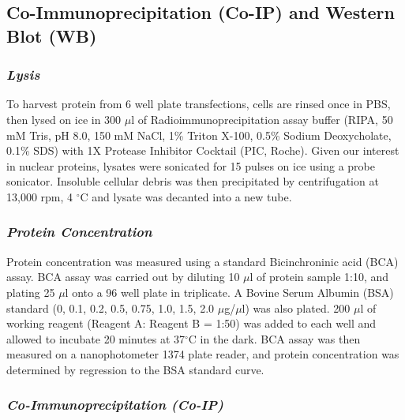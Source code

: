 \documentclass[onehalf,12pt]{beavtex}
\begin{document}
  \subsection{Co-Immunoprecipitation (Co-IP) and Western Blot
  (WB)}\label{co-immunoprecipitation-co-ip-and-western-blot-wb}
  
  \subsubsection*{\texorpdfstring{\emph{Lysis}}{Lysis}}\label{lysis}
  
  To harvest protein from 6 well plate transfections, cells are rinsed
  once in PBS, then lysed on ice in 300 \(\mu\)l of
  Radioimmunoprecipitation assay buffer (RIPA, 50 mM Tris, pH 8.0, 150 mM
  NaCl, 1\% Triton X-100, 0.5\% Sodium Deoxycholate, 0.1\% SDS) with 1X
  Protease Inhibitor Cocktail (PIC, Roche). Given our interest in nuclear
  proteins, lysates were sonicated for 15 pulses on ice using a probe
  sonicator. Insoluble cellular debris was then precipitated by
  centrifugation at 13,000 rpm, 4 \(^\circ\)C and lysate was decanted into
  a new tube.
  
  \subsubsection*{\texorpdfstring{\emph{Protein
  Concentration}}{Protein Concentration}}\label{protein-concentration}
  
  Protein concentration was measured using a standard Bicinchroninic acid
  (BCA) assay. BCA assay was carried out by diluting 10 \(\mu\)l of
  protein sample 1:10, and plating 25 \(\mu\)l onto a 96 well plate in
  triplicate. A Bovine Serum Albumin (BSA) standard (0, 0.1, 0.2, 0.5,
  0.75, 1.0, 1.5, 2.0 \(\mu\)g/\(\mu\)l) was also plated. 200 \(\mu\)l of
  working reagent (Reagent A: Reagent B = 1:50) was added to each well and
  allowed to incubate 20 minutes at 37\(^\circ\)C in the dark. BCA assay
  was then measured on a nanophotometer 1374 plate reader, and protein
  concentration was determined by regression to the BSA standard curve.
  
  \subsubsection*{\texorpdfstring{\emph{Co-Immunoprecipitation
  (Co-IP)}}{Co-Immunoprecipitation (Co-IP)}}\label{co-immunoprecipitation-co-ip}
  
\end{document}
